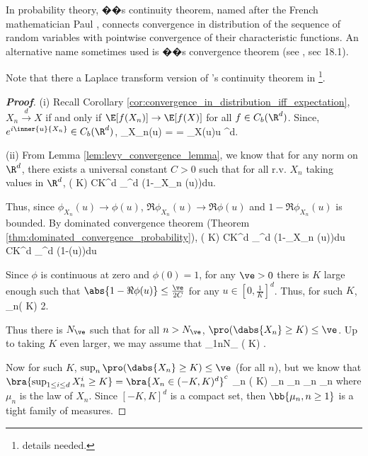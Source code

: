 \begin{remark}
In probability theory, \levy��s continuity theorem, named after the French mathematician Paul \levy, connects convergence in distribution of the sequence of random variables with pointwise convergence of their characteristic functions. An alternative name sometimes used is \levy��s convergence theorem (see \cite{Williams_1991}, sec 18.1).

Note that there a Laplace transform version of \levy's continuity theorem in \cite{Feller_1948}\footnote{details needed.}.
\end{remark}

\begin{proof}[\bf Proof]
\ben
\item [(i)] Recall Corollary \ref{cor:convergence_in_distribution_iff_expectation}, $X_n \stackrel{d}{\to} X$ if and only if $\E[ f (X_n)]\to \E[ f (X)]$ for all $f \in C_b(\R^d )$. Since, $e^{i\inner{u}{X_n}}\in C_b(\R^d)$,
\be
\phi_{X_n}(u) = \E {} \to \E {}= \phi_X(u)\quad \forall u \in \R^d.
\ee

\item [(ii)] From Lemma \ref{lem:levy_convergence_lemma}, we know that for any norm on $\R^d$, there exists a universal constant $C > 0$ such that for all r.v. $X_n$ taking values in $\R^d$,
\be
\pro( \geq K) \leq CK^d \int_{^d} (1-\Re\phi_{X_n} (u))du.
\ee

Thus, since $\phi_{X_n} (u) \to  \phi(u)$, $\Re \phi_{X_n} (u) \to  \Re \phi(u)$ and $1-\Re \phi_{X_n}(u)$ is bounded. By dominated convergence theorem (Theorem \ref{thm:dominated_convergence_probability}),
\be
\pro( \geq K) \leq CK^d \int_{^d} (1-\Re\phi_{X_n} (u))du \to CK^d \int_{^d} (1-\Re\phi (u))du
\ee

Since $\phi$ is continuous at zero and $\phi(0) = 1$, for any $\ve > 0$ there is $K$ large enough such that $\abs{1-\Re\phi(u)} \leq \frac{\ve}{2C}$ for any $u\in [0, \frac 1K ]^d$. Thus, for such $K$,
\be
\limsup_n\pro( \geq K) \leq \frac{\ve}2.
\ee

Thus there is $N_\ve$ such that for all $n > N_\ve$, $\pro(\dabs{X_n} \geq K) \leq \ve$. Up to taking $K$ even larger, we may assume that
\be
\sup_{1\leq n\leq N_\ve} \pro( \geq K) \leq \ve.
\ee

Now for such $K$, $\sup_n \pro(\dabs{X_n} \geq K) \leq \ve$ (for all $n$), but we know that $\bra{\sup_{1\leq i\leq d}X_n^i \geq K} = \bra{X_n \in (-K,K)^d}^c$
\be
\sup_n \pro( \geq K) \leq \ve\quad \lra\quad \sup_n \mu_n \leq \ve \quad\ra\quad \sup_n \mu_n\leq \ve
\ee
where $\mu_n$ is the law of $X_n$. Since $[-K, K]^d$ is a compact set, then $\bb{\mu_n,n\geq1}$ is a tight family of measures.


\end{proof}
